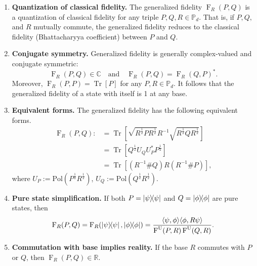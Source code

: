 \documentclass[12pt]{article}
\theoremstyle{definition}
\newcommand{\Fg}[3]{\operatorname{F}_{#3}\!\left(#1, #2\right)}
\newcommand{\Fu}[2]{\operatorname{F}^\mathrm{U}\!\left(#1, #2\right)}
\begin{document}
\begin{enumerate}
    \item \textbf{Quantization of classical fidelity.} The generalized fidelity $\operatorname{F}_R(P,Q) $ is a quantization of classical fidelity for any triple $P,Q,R \in \mathbb P_d$. That is, if $P,Q,$ and $R$ mutually commute, the generalized fidelity reduces to the classical fidelity (Bhattacharyya coefficient) between $P$ and $Q$. 
    \item \textbf{Conjugate symmetry.} Generalized fidelity is generally complex-valued and conjugate symmetric: 
    \begin{equation}
        \operatorname{F}_R(P, Q) \in \mathbb{C} \quad \text{and} \quad  \operatorname{F}_R(P, Q) = \Fg{Q}{P}{R}^*.
    \end{equation}
    Moreover, $ \Fg{P}{P}{R} = \operatorname{Tr}[P]$ for any $P, R \in \mathbb P_d$. It follows that the generalized fidelity of a state with itself is 1 at any base.
    \item  \textbf{Equivalent forms.} The generalized fidelity has the following equivalent forms.
    \begin{equation}
       \begin{aligned}
            \operatorname{F}_R(P,Q) :&= \operatorname{Tr} \left[\sqrt{R ^{\frac 12} P R ^{\frac 12} } R ^{-1} \sqrt{R ^{\frac 12} Q R ^{\frac 12} } \right]            \\ &= \operatorname{Tr}\left[Q ^{\frac12} U_Q U_P^* P^{\frac12}  \right] \\  
            &= \operatorname{Tr}\left[ (R ^{-1} \# Q) R (R ^{-1}  \#  P) \right],
       \end{aligned} 
    \end{equation}
    where $U_P := \text{Pol}\left(P^{\frac12}  R ^{\frac12} \right)$, $U_Q := \text{Pol}\left(Q^{\frac12} R^{\frac12} \right)$.
    \item \textbf{Pure state simplification.} If both $P = \ketbra{\psi}$ and $Q = \ketbra{\phi}$ are pure states, then
    \begin{equation}
        \operatorname{F}_R(P,Q) =  \Fg{\ketbra{\psi}}{\ketbra{\phi}}{R} = \frac{\langle \psi, \phi \rangle \langle \phi, R \psi \rangle }{\Fu{P}{R} \Fu{Q}{R}}. 
    \end{equation}
    \item \textbf{Commutation with base implies reality.} If the base $R$ commutes with $P$ or $Q$, then $\operatorname{F}_R(P, Q) \in \mathbb{R}$.

\end{enumerate}
\end{document}
